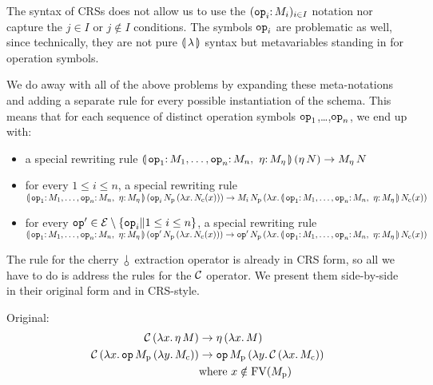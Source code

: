 
The syntax of CRSs does not allow us to use the $(\onto{\op{op}_i}{M_i})_{i
  \in I}$ notation nor capture the $j \in I$ or $j \notin I$ conditions.
The symbols $\mathtt{op}_i$ are problematic as well, since technically, they
are not pure $\llparenthesis \, \lambda \, \rrparenthesis$ syntax but metavariables standing in for
operation symbols.

We do away with all of the above problems by expanding these meta-notations
and adding a separate rule for every possible instantiation of the
schema. This means that for each sequence of distinct operation symbols
$\mathtt{op}_1$,\ldots,$\mathtt{op}_n$, we end up with:
\begin{itemize}
\item a special rewriting rule
  $\ap{\banana{\onto{\op{op}_1}{M_1},\ldots,\onto{\op{op}_n}{M_n},\ 
    \onto{\eta}{M_\eta}}}{(\etaE{N})}
  \to \ap{M_\eta}{N}$
\item for every $1 \le i \le n$, a special rewriting rule \\
  $\ap{\banana{\onto{\op{op}_1}{M_1},\ldots,\onto{\op{op}_n}{M_n},\ 
    \onto{\eta}{M_\eta}}}{(\app{\op{op}_i}{N_{\mathrm{p}}}{(\lam{x}{N_{\mathrm{c}}(x)})})}
  \\ \to
  \app{M_i}{N_{\mathrm{p}}}{(\lam{x}{\ap{\banana{\onto{\op{op}_1}{M_1},\ldots,\onto{\op{op}_n}{M_n},\ \onto{\eta}{M_\eta}}}{N_{\mathrm{c}}(x)}})}$
\item for every $\mathtt{op}' \in \mathcal{E} \setminus \{\mathtt{op}_i \| 1 \le i \le n\}$, a special
  rewriting rule \\
  $\ap{\banana{\onto{\op{op}_1}{M_1},\ldots,\onto{\op{op}_n}{M_n},\ 
    \onto{\eta}{M_\eta}}}{(\app{\op{op}'}{N_{\mathrm{p}}}{(\lam{x}{N_{\mathrm{c}}(x)})})}
  \\ \to
  \app{\op{op}'}{N_{\mathrm{p}}}{(\lam{x}{\ap{\banana{\onto{\op{op}_1}{M_1},\ldots,\onto{\op{op}_n}{M_n},\ \onto{\eta}{M_\eta}}}{N_{\mathrm{c}}(x)}})}$
\end{itemize}

The rule for the cherry $\cherry$ extraction operator is already in CRS
form, so all we have to do is address the rules for the $\mathcal{C}$ operator. We
present them side-by-side in their original form and in CRS-style.

Original:
\begin{align*}
  \mathcal{C}\,(\lambda x.\, \eta\,M) & \to \eta\,(\lambda x.\, M) \\
  \mathcal{C}\,(\lambda x.\, \mathtt{op}\,M_{\mathrm{p}}\,(\lambda y.\, M_{\mathrm{c}}))
  & \to
  \mathtt{op}\,M_{\mathrm{p}}\,(\lambda y.\, \mathcal{C}\,(\lambda x.\, M_{\mathrm{c}})) \\
  & \mathrm{where\ } x \notin \operatorname{FV}(M_{\mathrm{p}})
\end{align*}

